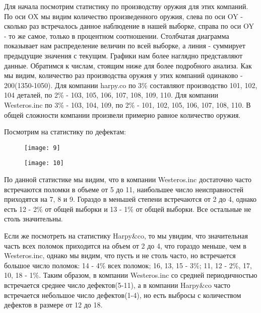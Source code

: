 \documentclass{beamer}
\begin{document}
\begin{frame}
Для начала посмотрим статистику по производству оружия для этих компаний. По оси OX мы видим количество произведенного оружия, слева по оси OY - сколько раз встречалось данное наблюдение в нашей выборке, справа по оси OY - то же самое, только в процентном соотношении. Столбчатая диаграмма показывает нам распределение величин по всей выборке, а линия - суммирует предыдущие значения с текущим. Графики нам более наглядно представляют данные. Обратимся к числам, стоящим ниже для более подробного анализа. 
Как мы видим, количество раз производства оружия у этих компаний одинаково - 200(1350-1050). Для компании harpy.co по 3\% составляют производство 101, 102, 104 деталей, по 2\% - 103, 105, 106, 107, 108, 109, 110. Для компании Westeros.inc по 3\% - 103, 104, 109, по 2\% - 101, 102, 105, 106, 107, 108, 110. В общей сложности компании произвели примерно равное количество оружия.

\end{frame}

\begin{frame}
Посмотрим на статистику по дефектам:
\begin{figure}[t]
\centering
\texttt{[image: 9]}
\end{figure}
\end{frame}

\begin{frame}
\begin{figure}[t]
\centering
\texttt{[image: 10]}
\end{figure}
\end{frame}

\begin{frame}
По данной статистике мы видим, что в компании Westeros.inc достаточно часто встречаются поломки в объеме от 5 до 11, наибольшее число неисправностей приходятся на 7, 8 и 9. Гораздо в меньшей степени встречаются от 2 до 4, однако есть 12 - 2\% от общей выборки и 13 - 1\% от общей выборки. Все остальные не столь значительны.

Если же посмотреть на статистику Harpy\&co, то мы увидим, что значительная часть всех поломок приходится на объем от 2 до 4, что гораздо меньше, чем в Westeros.inc, однако мы видим, что пусть и не столь часто, но встречается большое число поломок: 14 - 4\% всех поломок; 16, 13, 15 - 3\%; 11, 12 - 2\%, 17, 10, 18 - 1\%. 
Таким образом, в компании Westeros.inc со средней периодичностью встречается среднее число дефектов(5-11), а в компании Harpy\&co часто встречается небольшое число дефектов(1-4), но есть выбросы с количеством дефектов в размере от 12 до 18.

\end{frame}
\end{document}
